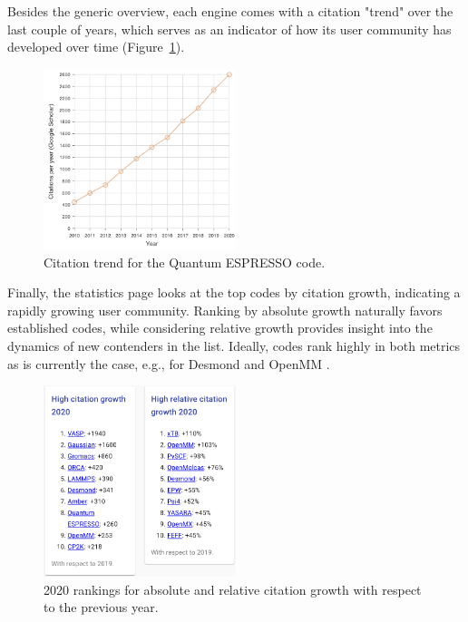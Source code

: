 \documentclass[9pt,review]{livecoms}
\begin{document}
Besides the generic overview, each engine comes with a citation "trend" over the last couple of years, which serves as an indicator of how its user community has developed over time (Figure~\ref{fig:quantum-espresso}).



\begin{figure}
    \includegraphics[width=0.5\textwidth]{figures/quantum-espresso}
    \caption{
        Citation trend for the Quantum ESPRESSO code.
    }
    \label{fig:quantum-espresso}
\end{figure}

Finally, the statistics page looks at the top codes by citation growth, indicating a rapidly growing user community. 
Ranking by absolute growth naturally favors established codes, while considering relative growth provides insight into the dynamics of new contenders in the list.
Ideally, codes rank highly in both metrics as is currently the case, e.g., for Desmond \cite{Desmond2021} and OpenMM \cite{Eastman2017}.

\begin{figure}
    \includegraphics[width=0.5\textwidth]{figures/highly-cited}
    \caption{
        2020 rankings for absolute and relative citation growth with respect to the previous year.
    }
    \label{fig:highly-cited}
\end{figure}
\end{document}
